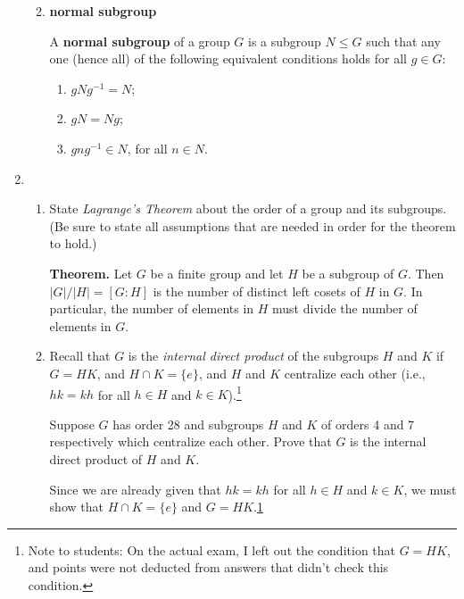 \documentclass[fleqn,12pt]{article}
\newcommand{\<}{\ensuremath{\langle}}
\renewcommand{\>}{\ensuremath{\rangle}}
\begin{document}
\begin{enumerate}[{\bf 1.}]
\begin{enumerate}
    \bigskip

  \item {\bf normal subgroup}
    \medskip

    A {\bf normal subgroup} of a group $G$ is a subgroup $N\leq G$ such that
    any one (hence all) of the following equivalent conditions holds for all $g\in G$:
    \begin{enumerate}
    \item $g N g^{-1} = N$;
    \item $g N = Ng$;
    \item $g n g^{-1} \in N$, for all $n\in N$.
    \end{enumerate}

    \bigskip


  \end{enumerate}

\newpage

\item
  \begin{enumerate}
  \item State \emph{Lagrange's Theorem} about the order of a group and its
    subgroups. (Be sure to state all assumptions that are needed in order for
    the theorem to hold.)  

    \medskip

    {\bf Theorem.} Let $G$ be a finite group and let $H$ be a subgroup
    of $G$. Then $|G|/|H| = [G : H]$ is the number of distinct left cosets of $H$ in
    $G$. In particular, the number of elements in $H$ must divide the number of
    elements in $G$.

    \bigskip

    \item Recall that $G$ is the \emph{internal direct product} of the subgroups
      $H$ and $K$ if $G = HK$, and $H\cap K= \{e\}$, and $H$ and $K$ centralize
      each other (i.e., $hk = kh$ for all $h\in H$ and $k\in
      K$).\footnote{\label{note1}Note to students: On the actual exam, I left
        out the condition that $G = HK$, and points were not deducted from
        answers that didn't check this condition.}

\medskip

      Suppose $G$ has order 28 and subgroups $H$ and $K$ of orders 4
      and 7 respectively which centralize each other.  Prove that
      $G$ is the internal direct product of $H$ and $K$.

      \medskip

      Since we are already given that $hk = kh$ for all $h\in H$ and $k\in K$, we 
      must show that $H\cap K= \{e\}$ and $G = HK$.\cref{note1}


\end{enumerate}
\end{enumerate}
\end{document}
